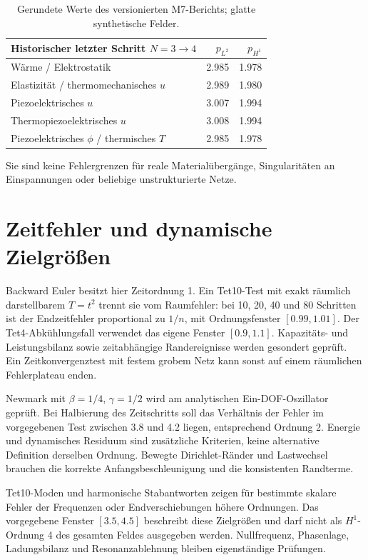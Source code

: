 \begin{table}[htbp]\centering
\begin{tabular}{lrr}\toprule
Historischer letzter Schritt $N=3\to4$ & $p_{L^2}$ & $p_{H^1}$\\\midrule
Wärme / Elektrostatik & 2.985 & 1.978\\
Elastizität / thermomechanisches $u$ & 2.989 & 1.980\\
Piezoelektrisches $u$ & 3.007 & 1.994\\
Thermopiezoelektrisches $u$ & 3.008 & 1.994\\
Piezoelektrisches $\phi$ / thermisches $T$ & 2.985 & 1.978\\
\bottomrule\end{tabular}
\caption{Gerundete Werte des versionierten M7-Berichts; glatte synthetische Felder.}
\end{table}
Sie sind keine Fehlergrenzen für reale Materialübergänge, Singularitäten an
Einspannungen oder beliebige unstrukturierte Netze.

\section{Zeitfehler und dynamische Zielgrößen}
Backward Euler besitzt hier Zeitordnung 1. Ein Tet10-Test mit exakt räumlich
darstellbarem $T=t^2$ trennt sie vom Raumfehler: bei 10, 20, 40 und 80 Schritten
ist der Endzeitfehler proportional zu $1/n$, mit Ordnungsfenster $[0.99,1.01]$.
Der Tet4-Abkühlungsfall verwendet das eigene Fenster $[0.9,1.1]$.
Kapazitäts- und Leistungsbilanz sowie zeitabhängige Randereignisse werden
gesondert geprüft. Ein Zeitkonvergenztest mit festem grobem Netz kann sonst
auf einem räumlichen Fehlerplateau enden.

Newmark mit $\beta=1/4$, $\gamma=1/2$ wird am analytischen Ein-DOF-Oszillator
geprüft. Bei Halbierung des Zeitschritts soll das Verhältnis der Fehler im
vorgegebenen Test zwischen 3.8 und 4.2 liegen, entsprechend Ordnung 2.
Energie und dynamisches Residuum sind zusätzliche Kriterien, keine alternative
Definition derselben Ordnung. Bewegte Dirichlet-Ränder und Lastwechsel
brauchen die korrekte Anfangsbeschleunigung und die konsistenten Randterme.

Tet10-Moden und harmonische Stabantworten zeigen für bestimmte skalare
Fehler der Frequenzen oder Endverschiebungen höhere Ordnungen. Das vorgegebene Fenster
$[3.5,4.5]$ beschreibt diese Zielgrößen und darf nicht als $H^1$-Ordnung 4
des gesamten Feldes ausgegeben werden. Nullfrequenz, Phasenlage, Ladungsbilanz
und Resonanzablehnung bleiben eigenständige Prüfungen.

